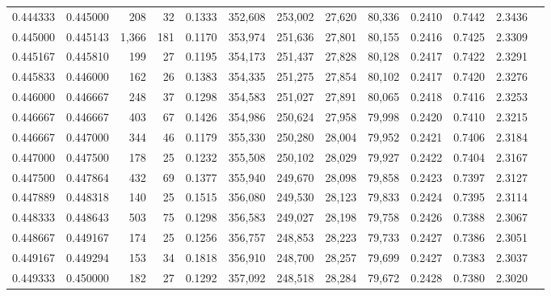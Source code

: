\begin{tabular}{rrrrrrrrrrrrr}
0.444333 & 0.445000 &   208 &  32 &                                     0.1333 & 352,608 & 253,002 &  27,620 &  80,336 & 0.2410 & 0.7442 & 2.3436 \\
0.445000 & 0.445143 & 1,366 & 181 &                                     0.1170 & 353,974 & 251,636 &  27,801 &  80,155 & 0.2416 & 0.7425 & 2.3309 \\
0.445167 & 0.445810 &   199 &  27 &                                     0.1195 & 354,173 & 251,437 &  27,828 &  80,128 & 0.2417 & 0.7422 & 2.3291 \\
0.445833 & 0.446000 &   162 &  26 &                                     0.1383 & 354,335 & 251,275 &  27,854 &  80,102 & 0.2417 & 0.7420 & 2.3276 \\
0.446000 & 0.446667 &   248 &  37 &                                     0.1298 & 354,583 & 251,027 &  27,891 &  80,065 & 0.2418 & 0.7416 & 2.3253 \\
0.446667 & 0.446667 &   403 &  67 &                                     0.1426 & 354,986 & 250,624 &  27,958 &  79,998 & 0.2420 & 0.7410 & 2.3215 \\
0.446667 & 0.447000 &   344 &  46 &                                     0.1179 & 355,330 & 250,280 &  28,004 &  79,952 & 0.2421 & 0.7406 & 2.3184 \\
0.447000 & 0.447500 &   178 &  25 &                                     0.1232 & 355,508 & 250,102 &  28,029 &  79,927 & 0.2422 & 0.7404 & 2.3167 \\
0.447500 & 0.447864 &   432 &  69 &                                     0.1377 & 355,940 & 249,670 &  28,098 &  79,858 & 0.2423 & 0.7397 & 2.3127 \\
0.447889 & 0.448318 &   140 &  25 &                                     0.1515 & 356,080 & 249,530 &  28,123 &  79,833 & 0.2424 & 0.7395 & 2.3114 \\
0.448333 & 0.448643 &   503 &  75 &                                     0.1298 & 356,583 & 249,027 &  28,198 &  79,758 & 0.2426 & 0.7388 & 2.3067 \\
0.448667 & 0.449167 &   174 &  25 &                                     0.1256 & 356,757 & 248,853 &  28,223 &  79,733 & 0.2427 & 0.7386 & 2.3051 \\
0.449167 & 0.449294 &   153 &  34 &                                     0.1818 & 356,910 & 248,700 &  28,257 &  79,699 & 0.2427 & 0.7383 & 2.3037 \\
0.449333 & 0.450000 &   182 &  27 &                                     0.1292 & 357,092 & 248,518 &  28,284 &  79,672 & 0.2428 & 0.7380 & 2.3020 \\

\end{tabular}
